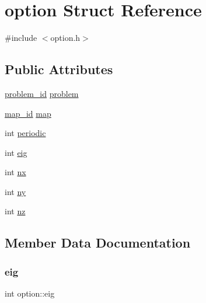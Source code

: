 \hypertarget{structoption}{}\section{option Struct Reference}
\label{structoption}


{\ttfamily \#include $<$option.\+h$>$}

\subsection*{Public Attributes}
\begin{DoxyCompactItemize}
\item 
\mbox{\hyperlink{problem_8h_acef34e4550d8d3c9873193b0aad44fa0}{problem\+\_\+id}} \mbox{\hyperlink{structoption_aa43577f2139053a973dfabaa1ea623b8}{problem}}
\item 
\mbox{\hyperlink{map_8h_accd0c06936991a4f805c3d1e0d116368}{map\+\_\+id}} \mbox{\hyperlink{structoption_a6a5e66d8293eecb02c83c26fd0e87c1e}{map}}
\item 
int \mbox{\hyperlink{structoption_aa045fec086086bd8bc4f6d333c549209}{periodic}}
\item 
int \mbox{\hyperlink{structoption_aef79731707a7019248f317fabc1b46ab}{eig}}
\item 
int \mbox{\hyperlink{structoption_a412dcc8397a83f8c750c418384f5039f}{nx}}
\item 
int \mbox{\hyperlink{structoption_aebfa4d915ceec63c92a0df6f85f9372e}{ny}}
\item 
int \mbox{\hyperlink{structoption_ab205e35229ba8ed0ce0fa7f469120921}{nz}}
\end{DoxyCompactItemize}


\subsection{Member Data Documentation}
\mbox{\label{structoption_aef79731707a7019248f317fabc1b46ab}} 
\subsubsection{\texorpdfstring{eig}{eig}}
{\footnotesize\ttfamily int option\+::eig}

\mbox{\label{structoption_a6a5e66d8293eecb02c83c26fd0e87c1e}} 
